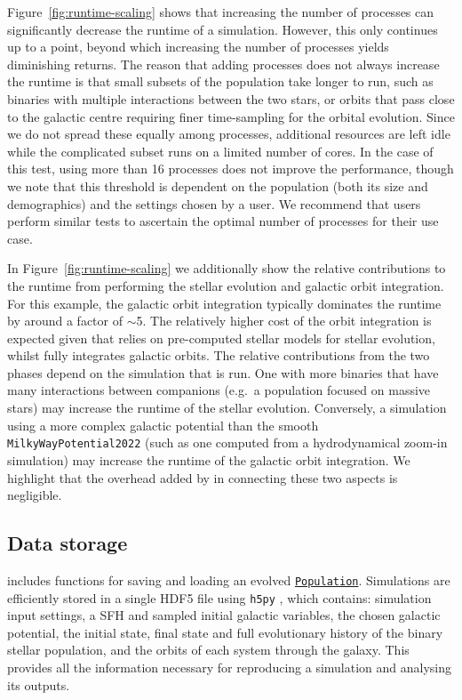 \documentclass[twocolumn, twocolappendix, oneside, linenumbers]{aastex631}
\newcommand{\codeLink}[2]{{\href{https://cogsworth.readthedocs.io/en/latest/api/cogsworth.#2.#1.html}{\color{codecolour} \texttt{#1}}}}
\begin{document}
Figure~\ref{fig:runtime-scaling} shows that increasing the number of processes can significantly decrease the runtime of a simulation. However, this only continues up to a point, beyond which increasing the number of processes yields diminishing returns. The reason that adding processes does not always increase the runtime is that small subsets of the population take longer to run, such as binaries with multiple interactions between the two stars, or orbits that pass close to the galactic centre requiring finer time-sampling for the orbital evolution. Since we do not spread these equally among processes, additional resources are left idle while the complicated subset runs on a limited number of cores. In the case of this test, using more than 16 processes does not improve the performance, though we note that this threshold is dependent on the population (both its size and demographics) and the settings chosen by a user. We recommend that users perform similar tests to ascertain the optimal number of processes for their use case.

In Figure~\ref{fig:runtime-scaling} we additionally show the relative contributions to the runtime from performing the stellar evolution and galactic orbit integration. For this example, the galactic orbit integration typically dominates the runtime by around a factor of $\sim$5. The relatively higher cost of the orbit integration is expected given that \cosmic relies on pre-computed stellar models for stellar evolution, whilst \gala fully integrates galactic orbits. The relative contributions from the two phases depend on the simulation that is run. One with more binaries that have many interactions between companions (e.g.\ a population focused on massive stars) may increase the runtime of the stellar evolution. Conversely, a simulation using a more complex galactic potential than the smooth \texttt{MilkyWayPotential2022} (such as one computed from a hydrodynamical zoom-in simulation) may increase the runtime of the galactic orbit integration. We highlight that the overhead added by \cogsworth in connecting these two aspects is negligible.

\subsection{Data storage}\label{sec:data}

\cogsworth includes functions for saving and loading an evolved \codeLink{Population}{pop}. Simulations are efficiently stored in a single HDF5 file using \texttt{h5py} \citep{collette_python_hdf5_2014}, which contains: simulation input settings, a SFH and sampled initial galactic variables, the chosen galactic potential, the initial state, final state and full evolutionary history of the binary stellar population, and the orbits of each system through the galaxy. This provides all the information necessary for  reproducing a simulation and analysing its outputs.
\end{document}
